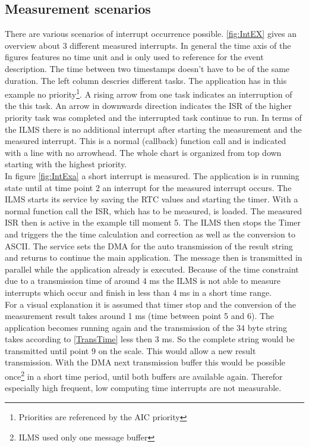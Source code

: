 \subsection{Measurement scenarios}
\label{timerovfl}
There are various scenarios of interrupt occurrence possible. \autoref{fig:IntEX} gives an overview about 3 different measured interrupts. In general the time axis of the figures features no time unit and is only used to reference for the event description. The time between two timestamps doesn't have to be of the same duration. The left column descries different tasks. The application has in this example no priority\footnote{Priorities are referenced by the \ac{AIC} priority}. A rising arrow from one task indicates an interruption of the this task. An arrow in downwards direction indicates the \ac{ISR} of the higher priority task was completed and the interrupted task continue to run. In terms of the \ac{ILMS} there is no additional interrupt after starting the measurement and the measured interrupt. This is a normal (callback) function call and is indicated with a line with no arrowhead. The whole chart is organized from top down starting with the highest priority.\\
In figure \ref{fig:IntExa} a short interrupt is measured. The application is in running state until at time point 2 an interrupt for the measured interrupt occurs. The \ac{ILMS} starts its service by saving the \ac{RTC} values and starting the timer. With a normal function call the \ac{ISR}, which has to be measured, is loaded. The measured \ac{ISR} then is active in the example till moment 5. The \ac{ILMS} then stops the Timer and triggers the the time calculation and correction as well as the conversion to ASCII. The service sets the \ac{DMA} for the auto transmission of the result string and returns to continue the main application. The message then is transmitted in parallel while the application already is executed. Because of the time constraint due to a transmission time of around 4 ms the \ac{ILMS} is not able to measure interrupts which occur and finish in less than 4 ms in a short time range.\\
For a visual explanation it is assumed that timer stop and the conversion of the measurement result takes around 1 ms (time between point 5 and 6). The application becomes running again and the transmission of the 34 byte string takes according to \autoref{TransTime} less then 3 ms. So the complete string would be transmitted until point 9 on the scale. This would allow a new result transmission. With the \ac{DMA} next transmission buffer this would be possible once\footnote{\ac{ILMS} used only one message buffer} in a short time period, until both buffers are available again. Therefor especially high frequent, low computing time interrupts are not measurable.\\

